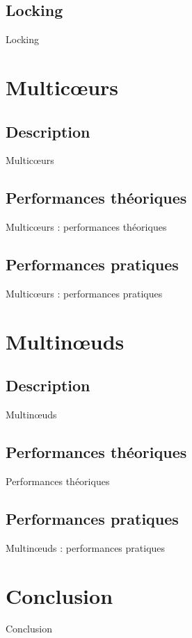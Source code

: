 \documentclass[9.5pt]{beamer}
\begin{document}
	\subsection{Locking}
		\begin{frame}{Locking}

		\end{frame}

\section{Multic\oe{}urs}
		\subsection{Description}
		\begin{frame}{Multic\oe{}urs}

		\end{frame}

	\subsection{Performances théoriques}
		\begin{frame}{Multic\oe{}urs : performances théoriques}

		\end{frame}

	\subsection{Performances pratiques}
		\begin{frame}{Multic\oe{}urs : performances pratiques}

		\end{frame}

\section{Multin\oe{}uds}
	\subsection{Description}
		\begin{frame}{Multin\oe{}uds}

		\end{frame}

	\subsection{Performances théoriques}
		\begin{frame}{Performances théoriques}

		\end{frame}

	\subsection{Performances pratiques}

		\begin{frame}{Multin\oe{}uds : performances pratiques}

		\end{frame}

\section{Conclusion}
	\begin{frame}{Conclusion}

	\end{frame}
\end{document}
